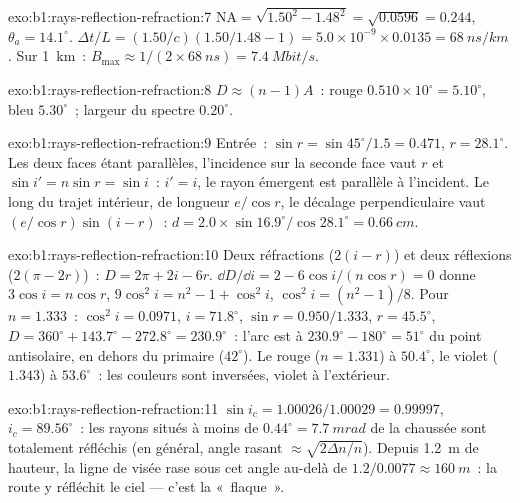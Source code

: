 \begin{solution}{exo:b1:rays-reflection-refraction:7}
$\mathrm{NA} = \sqrt{1.50^2 - 1.48^2} = \sqrt{0.0596} = 0.244$,
$\theta_a = 14.1^\circ$. $\Delta t/L = (1.50/c)(1.50/1.48 - 1) =
5.0\times10^{-9} \times 0.0135 = \qty{68}{ns/km}$. Sur \qty{1}{km}~:
$B_{\max} \approx 1/(2 \times \qty{68}{ns}) = \qty{7.4}{Mbit/s}$.
\end{solution}

\begin{solution}{exo:b1:rays-reflection-refraction:8}
$D \approx (n - 1)A$~: rouge $0.510 \times 10^\circ = 5.10^\circ$, bleu
$5.30^\circ$~; largeur du spectre $0.20^\circ$.
\end{solution}

\begin{solution}{exo:b1:rays-reflection-refraction:9}
Entrée~: $\sin r = \sin 45^\circ/1.5 = 0.471$, $r = 28.1^\circ$. Les deux
faces étant parallèles, l'incidence sur la seconde face vaut $r$ et
$\sin i' = n\sin r = \sin i$~: $i' = i$, le rayon émergent est parallèle
à l'incident. Le long du trajet intérieur, de longueur $e/\cos r$, le
décalage perpendiculaire vaut $(e/\cos r)\sin(i - r)$~:
$d = 2.0 \times \sin 16.9^\circ/\cos 28.1^\circ = \qty{0.66}{cm}$.
\end{solution}

\begin{solution}{exo:b1:rays-reflection-refraction:10}
Deux réfractions ($2(i - r)$) et deux réflexions ($2(\pi - 2r)$)~:
$D = 2\pi + 2i - 6r$. $\dd D/\dd i = 2 - 6\cos i/(n\cos r) = 0$ donne
$3\cos i = n\cos r$, $9\cos^2 i = n^2 - 1 + \cos^2 i$, $\cos^2 i =
(n^2 - 1)/8$. Pour $n = 1.333$~: $\cos^2 i = 0.0971$, $i = 71.8^\circ$,
$\sin r = 0.950/1.333$, $r = 45.5^\circ$, $D = 360^\circ + 143.7^\circ -
272.8^\circ = 230.9^\circ$~: l'arc est à $230.9^\circ - 180^\circ =
51^\circ$ du point antisolaire, en dehors du primaire ($42^\circ$).
Le rouge ($n = 1.331$) à $50.4^\circ$, le violet ($1.343$) à $53.6^\circ$~:
les couleurs sont inversées, violet à l'extérieur.
\end{solution}

\begin{solution}{exo:b1:rays-reflection-refraction:11}
$\sin i_c = 1.00026/1.00029 = 0.99997$, $i_c = 89.56^\circ$~: les rayons
situés à moins de $0.44^\circ = \qty{7.7}{mrad}$ de la chaussée sont
totalement réfléchis (en général, angle rasant $\approx \sqrt{2\Delta n/n}$).
Depuis \qty{1.2}{m} de hauteur, la ligne de visée rase sous cet angle
au-delà de $1.2/0.0077 \approx \qty{160}{m}$~: la route y réfléchit le
ciel --- c'est la «~flaque~».
\end{solution}

